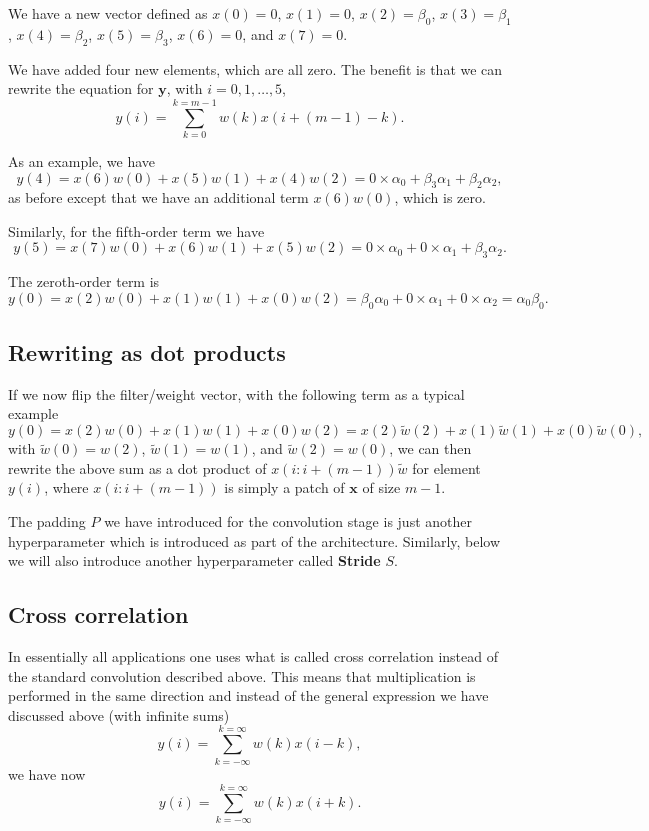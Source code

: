 \documentclass[%
oneside,                 %
final,                   %
10pt]{article}
\begin{document}
We have a new vector defined as $x(0)=0$, $x(1)=0$,
$x(2)=\beta_0$, $x(3)=\beta_1$, $x(4)=\beta_2$, $x(5)=\beta_3$,
$x(6)=0$, and $x(7)=0$.

We have added four new elements, which
are all zero. The benefit is that we can rewrite the equation for
$\bm{y}$, with $i=0,1,\dots,5$,
\[
y(i) = \sum_{k=0}^{k=m-1}w(k)x(i+(m-1)-k).
\]

As an example, we have
\[
y(4)=x(6)w(0)+x(5)w(1)+x(4)w(2)=0\times \alpha_0+\beta_3\alpha_1+\beta_2\alpha_2,
\]
as before except that we have an additional term $x(6)w(0)$, which is zero.

Similarly, for the fifth-order term we have
\[
y(5)=x(7)w(0)+x(6)w(1)+x(5)w(2)=0\times \alpha_0+0\times\alpha_1+\beta_3\alpha_2.
\]

The zeroth-order term is
\[
y(0)=x(2)w(0)+x(1)w(1)+x(0)w(2)=\beta_0 \alpha_0+0\times\alpha_1+0\times\alpha_2=\alpha_0\beta_0.
\]

\subsection{Rewriting as dot products}

If we now flip the filter/weight vector, with the following term as a typical example
\[
y(0)=x(2)w(0)+x(1)w(1)+x(0)w(2)=x(2)\tilde{w}(2)+x(1)\tilde{w}(1)+x(0)\tilde{w}(0),
\]
with $\tilde{w}(0)=w(2)$, $\tilde{w}(1)=w(1)$, and $\tilde{w}(2)=w(0)$, we can then rewrite the above sum as a dot product of
$x(i:i+(m-1))\tilde{w}$ for element $y(i)$, where $x(i:i+(m-1))$ is simply a patch of $\bm{x}$ of size $m-1$.

The padding $P$ we have introduced for the convolution stage is just
another hyperparameter which is introduced as part of the
architecture. Similarly, below we will also introduce another
hyperparameter called \textbf{Stride} $S$. 

\subsection{Cross correlation}

In essentially all applications one uses what is called cross correlation instead of the standard convolution described above.
This means that multiplication is performed in the same direction and instead of the general expression we have discussed above (with infinite sums)
\[
y(i) = \sum_{k=-\infty}^{k=\infty}w(k)x(i-k),
\]
we have now
\[
y(i) = \sum_{k=-\infty}^{k=\infty}w(k)x(i+k).
\]
\end{document}
